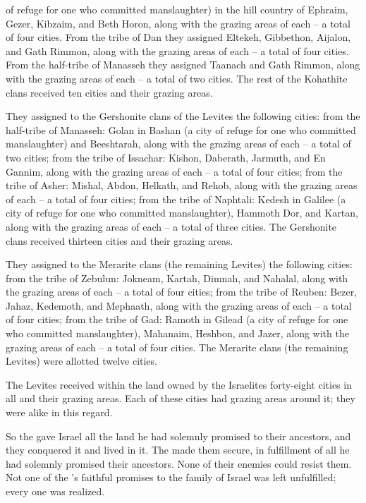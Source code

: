 {of refuge
for one who committed manslaughter) in the hill country
of Ephraim,
Gezer,
Kibzaim,
and Beth Horon,
along with the grazing areas of each – a total of four cities.
From the tribe
of Dan
they assigned Eltekeh,
Gibbethon,
Aijalon,
and Gath Rimmon,
along
with the grazing areas of each – a total of four cities.
From the half-tribe
of Manasseh
they assigned Taanach
and Gath Rimmon,
along
with the grazing areas of each – a total of two cities.
The rest
of the Kohathite
clans
received ten
cities
and their grazing areas.
\par }{\PP {}They assigned
to the
Gershonite
clans
of the Levites
the following cities: from the half-tribe
of Manasseh: Golan
in Bashan
(a city
of refuge
for one who
committed manslaughter) and Beeshtarah,
along with the grazing areas of each – a total of two cities;
from the tribe
of Issachar: Kishon,
Daberath,
Jarmuth,
and En Gannim,
along
with the grazing areas of each – a total of four cities;
from the tribe
of Asher: Mishal,
Abdon,
Helkath,
and
Rehob,
along with the grazing areas of each – a total of four cities;
from the tribe
of Naphtali: Kedesh
in Galilee
(a city
of refuge
for one who committed manslaughter), Hammoth Dor,
and Kartan,
along
with the grazing areas of each – a total of three cities.
The Gershonite
clans
received thirteen
cities
and their grazing areas.
\par }{\PP {}They assigned to the Merarite
clans
(the remaining
Levites) the following cities: from the tribe
of Zebulun: Jokneam,
Kartah,
Dimnah,
and Nahalal,
along with the grazing areas of each – a total of four cities;
from the tribe
of Reuben: Bezer,
Jahaz,
Kedemoth,
and
Mephaath,
along with the grazing areas of each – a total of four cities;
from the tribe
of Gad: Ramoth
in Gilead
(a city
of refuge
for one who committed manslaughter), Mahanaim,
Heshbon,
and
Jazer,
along with the grazing areas of each – a total of four cities.
The Merarite
clans
(the remaining
Levites) were
allotted
twelve
cities.
\par }{\PP {}The Levites
received within
the land
owned
by the Israelites
forty-eight
cities
in all
and their grazing areas.
Each of these
cities
had grazing areas
around
it; they were
alike
in this
regard.
\par }{\PP {}So the
{}
gave
Israel
all
the land
he had
solemnly
promised
to their ancestors,
and they conquered
it and lived in it.
The
{}
made them secure,
in fulfillment
of all
he had
solemnly
promised their ancestors.
None
of their enemies
could resist them.
Not one
of the
{}’s
faithful
promises
to
the family
of Israel
was left unfulfilled;
every
one was realized.

}
